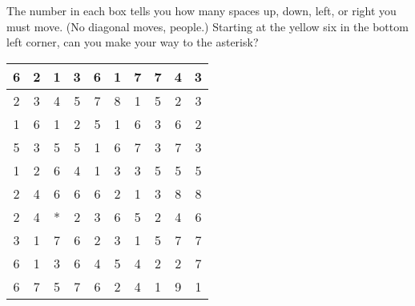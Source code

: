 \documentclass[12pt,letterpaper]{hmcpset}
\begin{document}
\begin{problem}
The number in each box tells you how many spaces up, down, left, or right you must move. (No diagonal moves, people.)
Starting at the yellow six in the bottom left corner, can you make your way to the asterisk?
\begin{center}
\begin{tabular}{|c|c|c|c|c|c|c|c|c|c|}
\hline
6 & 2 & 1 & 3 & 6 & 1 & 7 & 7 & 4 & 3 \\
\hline
2 & 3 & 4 & 5 & 7 & 8 & 1 & 5 & 2 & 3 \\
\hline
1 & 6 & 1 & 2 & 5 & 1 & 6 & 3 & 6 & 2 \\
\hline
5 & 3 & 5 & 5 & 1 & 6 & 7 & 3 & 7 & 3 \\
\hline
1 & 2 & 6 & 4 & 1 & 3 & 3 & 5 & 5 & 5 \\
\hline
2 & 4 & 6 & 6 & 6 & 2 & 1 & 3 & 8 & 8 \\
\hline
2 & 4 & * & 2 & 3 & 6 & 5 & 2 & 4 & 6 \\
\hline
3 & 1 & 7 & 6 & 2 & 3 & 1 & 5 & 7 & 7 \\
\hline
6 & 1 & 3 & 6 & 4 & 5 & 4 & 2 & 2 & 7 \\
\hline
\cellcolor{yellow}6 & 7 & 5 & 7 & 6 & 2 & 4 & 1 & 9 & 1 \\
\hline
\end{tabular}
\end{center}
\end{problem}
\end{document}
